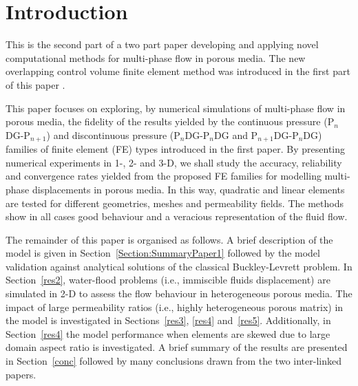 \documentclass[preprint,authoryear,12pt]{elsarticle}
\newcommand{\PN}[2][error]{P$_{#1}$DG-P$_{#2}$}
\begin{document}
\section{Introduction}


This is the second part of a two part paper developing and applying
novel computational methods for multi-phase flow in porous media. The
new overlapping control volume finite element method was introduced in
the first part of this paper \citep{gomes_2013}.

This paper focuses on exploring, by numerical simulations of
multi-phase flow in porous media, the fidelity of the results yielded
by the continuous pressure (\PN[n]{n+1}) and discontinuous pressure
(P$_n$DG-P$_n$DG and P$_{n+1}$DG-P$_n$DG) families of finite element
(FE) types introduced in the first paper. By presenting numerical
experiments in 1-, 2- and 3-D, we shall study the accuracy, reliability
and convergence rates yielded from the proposed FE
families for modelling multi-phase displacements in porous media. In this
way, quadratic and linear elements are tested for different
geometries, meshes and permeability fields. The methods show in all
cases good behaviour and a veracious representation of the fluid flow.

The remainder of this paper is organised as follows. A brief
description of the model is given in
Section~\ref{Section:SummaryPaper1} followed by the model validation
against analytical solutions of the classical Buckley-Levrett
problem. In Section~\ref{res2}, water-flood problems (i.e., immiscible
fluids displacement) are simulated in 2-D to assess the flow
behaviour in heterogeneous porous media. The impact of
large permeability ratios (i.e., highly heterogeneous porous matrix)
in the model is investigated in Sections~\ref{res3}, \ref{res4}
and~\ref{res5}. Additionally, in Section~\ref{res4} the model
performance when elements are skewed due to large domain aspect ratio
is investigated. A brief summary of the results are presented in
Section~\ref{conc} followed by many conclusions drawn from the two
inter-linked papers.




\end{document}
